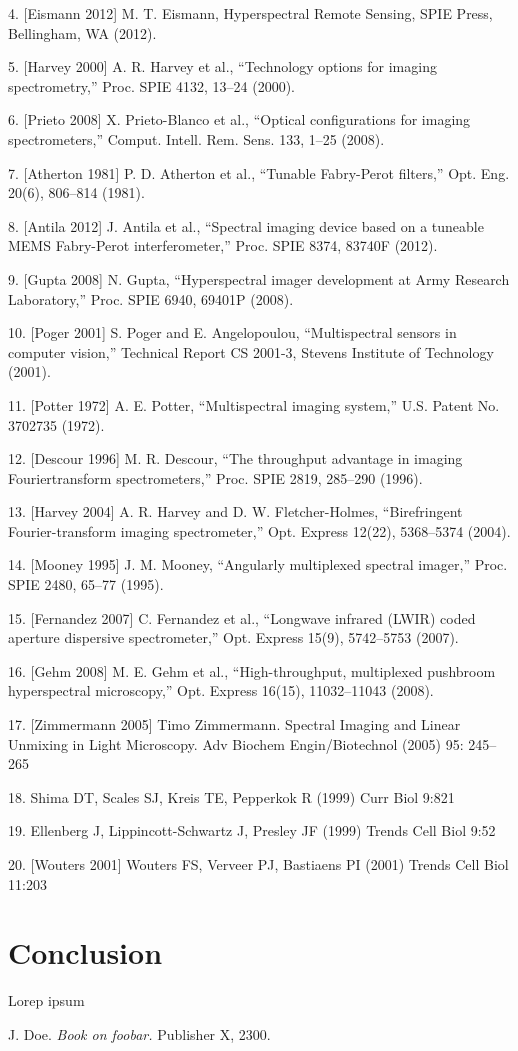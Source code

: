 \documentclass{ctuthesis}
\begin{document}
4. [Eismann 2012] M. T. Eismann, Hyperspectral Remote Sensing, SPIE Press, Bellingham, WA (2012).

5. [Harvey 2000] A. R. Harvey et al., “Technology options for imaging spectrometry,”
Proc. SPIE 4132, 13–24 (2000).

6. [Prieto 2008] X. Prieto-Blanco et al., “Optical configurations for imaging spectrometers,” Comput. Intell. Rem. Sens. 133, 1–25 (2008).

7. [Atherton 1981] P. D. Atherton et al., “Tunable Fabry-Perot filters,” Opt. Eng. 20(6),
806–814 (1981).

8. [Antila 2012] J. Antila et al., “Spectral imaging device based on a tuneable MEMS
Fabry-Perot interferometer,” Proc. SPIE 8374, 83740F (2012).

9. [Gupta 2008] N. Gupta, “Hyperspectral imager development at Army Research
Laboratory,” Proc. SPIE 6940, 69401P (2008).

10. [Poger 2001] S. Poger and E. Angelopoulou, “Multispectral sensors in computer
vision,” Technical Report CS 2001-3, Stevens Institute of Technology (2001).

11. [Potter 1972] A. E. Potter, “Multispectral imaging system,” U.S. Patent No. 3702735 (1972).

12. [Descour 1996] M. R. Descour, “The throughput advantage in imaging Fouriertransform spectrometers,” Proc. SPIE 2819, 285–290 (1996).

13. [Harvey 2004] A. R. Harvey and D. W. Fletcher-Holmes, “Birefringent Fourier-transform imaging spectrometer,” Opt. Express 12(22), 5368–5374 (2004).

14. [Mooney 1995] J. M. Mooney, “Angularly multiplexed spectral imager,” Proc. SPIE
2480, 65–77 (1995).

15. [Fernandez 2007] C. Fernandez et al., “Longwave infrared (LWIR) coded aperture
dispersive spectrometer,” Opt. Express 15(9), 5742–5753 (2007).

16. [Gehm 2008] M. E. Gehm et al., “High-throughput, multiplexed pushbroom hyperspectral microscopy,” Opt. Express 16(15), 11032–11043 (2008).

17. [Zimmermann 2005] Timo Zimmermann. Spectral Imaging and Linear Unmixing in Light Microscopy. Adv Biochem Engin/Biotechnol (2005) 95: 245– 265

18. Shima DT, Scales SJ, Kreis TE, Pepperkok R (1999) Curr Biol 9:821 

19. Ellenberg J, Lippincott-Schwartz J, Presley JF (1999) Trends Cell Biol 9:52

20. [Wouters 2001] Wouters FS, Verveer PJ, Bastiaens PI (2001) Trends Cell Biol 11:203
\chapter{Conclusion}

Lorep ipsum \cite{doe}

\begin{thebibliography}{1}

 J. Doe. \emph{Book on foobar.} Publisher X,
 2300.

\end{thebibliography}
\end{document}
